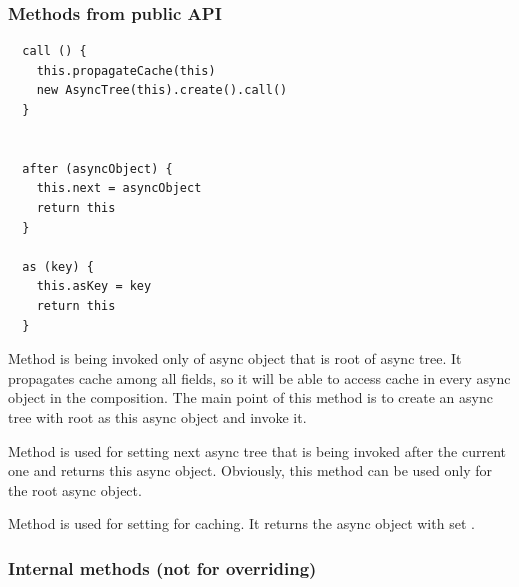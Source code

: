 \documentclass{article}
\begin{document}
\vspace*{10px}

\subsubsection{Methods from public API}

\begin{verbatim}
  call () {
    this.propagateCache(this)
    new AsyncTree(this).create().call()
  }


  after (asyncObject) {
    this.next = asyncObject
    return this
  }

  as (key) {
    this.asKey = key
    return this
  }
\end{verbatim}

Method  is being invoked only of async object that is root of async tree. It propagates cache among all fields, so it will be able to access cache in every async object in the composition. The main point of this method is to create an async tree with root as this async object and invoke it.

Method  is used for setting next async tree that is being invoked after the current one and returns this async object. Obviously, this method can be used only for the root async object.

Method  is used for setting  for caching. It returns the async object with set .

\vspace*{10px}

\subsubsection{Internal methods (not for overriding)}
\end{document}
